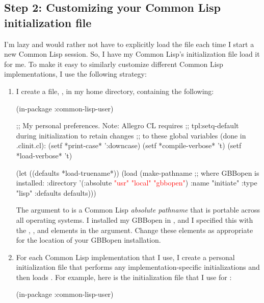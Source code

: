 \documentclass[10pt,twoside,english,pdftex]{article}
\begin{document}
\subsection*{Step 2: Customizing your Common Lisp initialization file}

I'm lazy and would rather not have to explicitly load the
 file each time I start a new
Common Lisp session.  So, I have my Common Lisp's initialization file load it
for me.  To make it easy to similarly customize different Common Lisp
implementations, I use the following strategy:

\begin{enumerate}

\item I create a file, , in my home directory,
  containing the following:
%
\W\supp\notpretop
\begin{example}
  (in-package :common-lisp-user)

  ;; My personal preferences.  Note: Allegro CL requires 
  ;; tpl:setq-default during initialization to retain changes
  ;; to these global variables (done in .clinit.cl):
  (setf *print-case* ':downcase)
  (setf *compile-verbose* 't)
  (setf *load-verbose* 't)

  (let ((defaults *load-truename*))
    (load (make-pathname 
            ;; where GBBopen is installed:
            :directory '(:absolute \textcolor{red}{"usr" "local" "gbbopen"})
            :name "initiate"
            :type "lisp"
            :defaults defaults)))
\end{example}

The  argument to  is a Common Lisp
\textit{absolute pathname} that is portable across all operating systems.  I
installed my GBBopen in , and I specified
this with the , , and  elements in
the  argument.  Change these elements as appropriate for the
location of your GBBopen installation.

\item For each Common Lisp implementation that I use, I create a personal
  initialization file that performs any implementation-specific
  initializations and then loads .  For example,
  here is the  initialization file that I use for
  :
%
\W\supp\notpretop
\begin{example}
  (in-package :common-lisp-user)


\end{example}
\end{enumerate}
\end{document}
